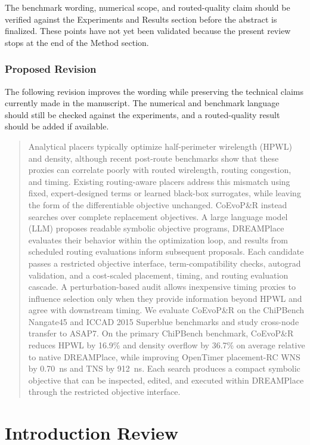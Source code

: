 \documentclass[11pt]{article}
\begin{document}
The benchmark wording, numerical scope, and routed-quality claim should be
verified against the Experiments and Results section before the abstract is
finalized. These points have not yet been validated because the present review
stops at the end of the Method section.

\section{Proposed Revision}

The following revision improves the wording while preserving the technical
claims currently made in the manuscript. The numerical and benchmark language
should still be checked against the experiments, and a routed-quality result
should be added if available.

\begin{quote}
Analytical placers typically optimize half-perimeter wirelength (HPWL) and
density, although recent post-route benchmarks show that these proxies can
correlate poorly with routed wirelength, routing congestion, and timing.
Existing routing-aware placers address this mismatch using fixed,
expert-designed terms or learned black-box surrogates, while leaving the form
of the differentiable objective unchanged. CoEvoP\&R instead searches over
complete replacement objectives. A large language model (LLM) proposes
readable symbolic objective programs, DREAMPlace evaluates their behavior
within the optimization loop, and results from scheduled routing evaluations
inform subsequent proposals. Each candidate passes a restricted objective
interface, term-compatibility checks, autograd validation, and a cost-scaled
placement, timing, and routing evaluation cascade. A perturbation-based audit
allows inexpensive timing proxies to influence selection only when they
provide information beyond HPWL and agree with downstream timing. We evaluate
CoEvoP\&R on the ChiPBench Nangate45 and ICCAD 2015 Superblue benchmarks and
study cross-node transfer to ASAP7. On the primary ChiPBench benchmark,
CoEvoP\&R reduces HPWL by 16.9\% and density overflow by 36.7\% on average
relative to native DREAMPlace, while improving OpenTimer placement-RC WNS by
0.70~ns and TNS by 912~ns. Each search produces a compact symbolic objective
that can be inspected, edited, and executed within DREAMPlace through the
restricted objective interface.
\end{quote}

\clearpage
\part{Introduction Review}
\end{document}
